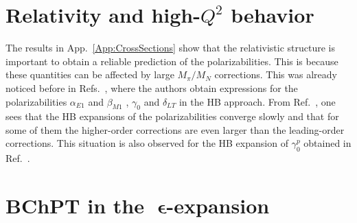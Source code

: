 \documentclass[twocolumn,prc,showpacs,nofootinbib,preprintnumbers,amsmath,amssymb,superscriptaddress]{revtex4-1}
\begin{document}



\section{Relativity and high-$Q^2$ behavior}
\label{Sec:Relativity-and-Q2behaviour}


The results in App.~\ref{App:CrossSections} show that the relativistic structure is important to obtain a reliable prediction of the polarizabilities. 
This is because these quantities can be affected by large $M_\pi/M_N$ corrections.
This was already noticed before in Refs.~\cite{Bernard:1991rq,Kao:2002cp}, where the authors obtain expressions for the polarizabilities $\alpha_{E1}$ and $\beta_{M1}$ \cite{Bernard:1991rq}, $\gamma_0$  and $\delta_{LT}$ \cite{Kao:2002cp} in the HB approach. 
From Ref.~\cite{Bernard:1991rq}, one sees that the HB expansions of the polarizabilities converge slowly and that for some of them the higher-order corrections are even larger than the leading-order corrections.
This situation is also observed for the HB expansion of $\gamma_0^p$ obtained in Ref.~\cite{Kao:2002cp}.

 \section{BChPT in the $\;\boldsymbol{\epsilon}$-expansion}
\label{Sec:newDiagrams}
\end{document}
